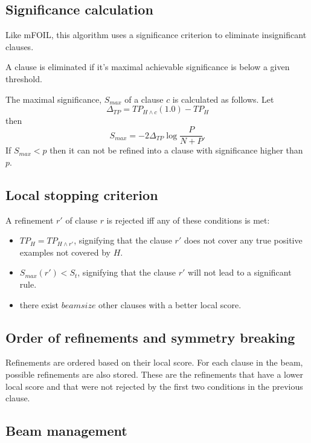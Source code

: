 \documentclass{article}
\begin{document}
\subsection{Significance calculation}

Like mFOIL, this algorithm uses a significance criterion to eliminate insignificant clauses.

A clause is eliminated if it's maximal achievable significance is below a given threshold.

\newcommand{\TP}{\ensuremath{\mathit{TP}}}
The maximal significance, $S_\mathit{max}$ of a clause $c$ is calculated as follows.
Let 
\[ \Delta_\TP = \TP_{H \wedge c}(1.0) - \TP_{H} \] 
then \[ S_\mathit{max} = -2 \Delta_\TP \log\frac{P}{N+P}.  \]
If $S_\mathit{max} < p$ then it can not be refined into a clause with significance higher than $p$.

\subsection{Local stopping criterion}

A refinement $r'$ of clause $r$ is rejected iff any of these conditions is met:
\begin{itemize}
	\item $\TP_H = \TP_{H \wedge r'}$, signifying that the clause $r'$ does not cover any true positive examples not covered by $H$.
	\item $S_\mathit{max}(r') < S_\mathit{t}$, signifying that the clause $r'$ will not lead to a significant rule.
	\item there exist $\mathit{beamsize}$ other clauses with a better local score.
\end{itemize}

\subsection{Order of refinements and symmetry breaking}

Refinements are ordered based on their local score.
For each clause in the beam, possible refinements are also stored.
These are the refinements that have a lower local score and that were not rejected by the first two conditions in the previous clause.

\subsection{Beam management}
\end{document}
